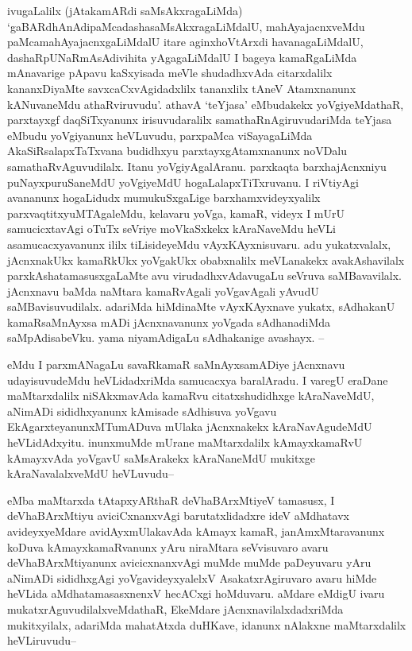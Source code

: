 \begin{artha}
ivugaLalilx (jAtakamARdi saMsAkxragaLiMda) `gaBARdhAnAdipaMcadashasaMsAkxragaLiMdalU, mahAyajacnxveMdu paMcamahAyajacnxgaLiMdalU itare aginxhoVtArxdi havanagaLiMdalU, dashaRpUNaRmAsAdivihita yAgagaLiMdalU I bageya kamaRgaLiMda mAnavarige pApavu kaSxyisada meVle shudadhxvAda citarxdalilx kananxDiyaMte savxcaCxvAgidadxlilx tananxlilx tAneV Atamxnanunx kANuvaneMdu athaRviruvudu'. athavA `teYjasa' eMbudakekx yoVgiyeMdathaR, parxtayxgf daqSiTxyanunx irisuvudaralilx samathaRnAgiruvudariMda teYjasa eMbudu yoVgiyanunx heVLuvudu, parxpaMca viSayagaLiMda AkaSiRsalapxTaTxvana budidhxyu parxtayxgAtamxnanunx noVDalu samathaRvAguvudilalx. Itanu yoVgiyAgalAranu. parxkaqta barxhajAcnxniyu puNayxpuruSaneMdU yoVgiyeMdU hogaLalapxTiTxruvanu. I riVtiyAgi avananunx hogaLidudx mumukuSxgaLige barxhamxvideyxyalilx parxvaqtitxyuMTAgaleMdu, kelavaru yoVga, kamaR, videyx I mUrU samucicxtavAgi oTuTx seVriye moVkaSxkekx kAraNaveMdu heVLi asamucacxyavanunx ililx tiLisideyeMdu vAyxKAyxnisuvaru. adu yukatxvalalx, jAcnxnakUkx kamaRkUkx yoVgakUkx obabxnalilx meVLanakekx avakAshavilalx parxkAshatamasusxgaLaMte avu virudadhxvAdavugaLu seVruva saMBavavilalx. jAcnxnavu baMda naMtara kamaRvAgali yoVgavAgali yAvudU saMBavisuvudilalx. adariMda hiMdinaMte vAyxKAyxnave yukatx, sAdhakanU kamaRsaMnAyxsa mADi jAcnxnavanunx yoVgada sAdhanadiMda saMpAdisabeVku. yama niyamAdigaLu sAdhakanige avashayx. -- 
\end{artha}

\begin{artha}
eMdu I parxmANagaLu savaRkamaR saMnAyxsamADiye jAcnxnavu udayisuvudeMdu heVLidadxriMda samucacxya baralAradu. I varegU eraDane maMtarxdalilx niSAkxmavAda kamaRvu citatxshudidhxge kAraNaveMdU, aNimADi sididhxyanunx kAmisade sAdhisuva yoVgavu EkAgarxteyanunxMTumADuva mUlaka jAcnxnakekx kAraNavAgudeMdU heVLidAdxyitu. inunxmuMde mUrane maMtarxdalilx kAmayxkamaRvU kAmayxvAda yoVgavU saMsArakekx kAraNaneMdU mukitxge kAraNavalalxveMdU heVLuvudu--
\end{artha}


\begin{artha}
eMba maMtarxda tAtapxyARthaR deVhaBArxMtiyeV tamasusx, I deVhaBArxMtiyu aviciCxnanxvAgi barutatxlidadxre ideV aMdhatavx avideyxyeMdare avidAyxmUlakavAda kAmayx kamaR, janAmxMtaravanunx koDuva kAmayxkamaRvanunx yAru niraMtara seVvisuvaro avaru deVhaBArxMtiyanunx avicicxnanxvAgi muMde muMde paDeyuvaru yAru aNimADi sididhxgAgi yoVgavideyxyalelxV AsakatxrAgiruvaro avaru hiMde heVLida aMdhatamasasxnenxV hecACxgi hoMduvaru. aMdare eMdigU ivaru mukatxrAguvudilalxveMdathaR, EkeMdare jAcnxnavilalxdadxriMda mukitxyilalx, adariMda mahatAtxda duHKave, idanunx nAlakxne maMtarxdalilx heVLiruvudu-- 
\end{artha}

